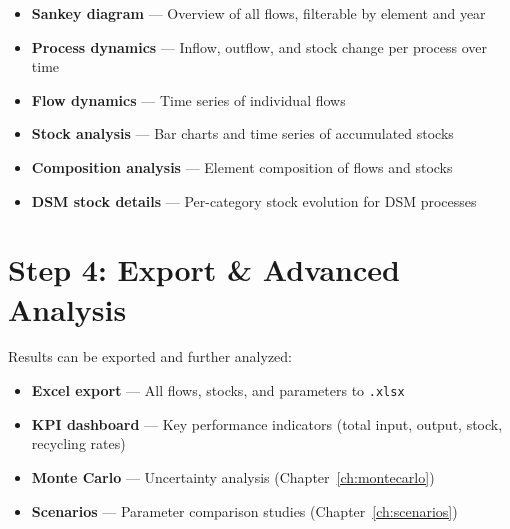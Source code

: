 \begin{itemize}
  \item \textbf{Sankey diagram} --- Overview of all flows, filterable by element and year
  \item \textbf{Process dynamics} --- Inflow, outflow, and stock change per process over time
  \item \textbf{Flow dynamics} --- Time series of individual flows
  \item \textbf{Stock analysis} --- Bar charts and time series of accumulated stocks
  \item \textbf{Composition analysis} --- Element composition of flows and stocks
  \item \textbf{DSM stock details} --- Per-category stock evolution for DSM processes
\end{itemize}

\section{Step 4: Export \& Advanced Analysis}

Results can be exported and further analyzed:

\begin{itemize}
  \item \textbf{Excel export} --- All flows, stocks, and parameters to \texttt{.xlsx}
  \item \textbf{KPI dashboard} --- Key performance indicators (total input, output, stock, recycling rates)
  \item \textbf{Monte Carlo} --- Uncertainty analysis (Chapter~\ref{ch:montecarlo})
  \item \textbf{Scenarios} --- Parameter comparison studies (Chapter~\ref{ch:scenarios})
\end{itemize}
